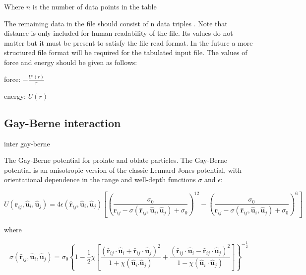 Where $n$ is the number of data points in the table

The remaining data in the file should consist of n data triples
  . Note that distance is only
included for human readability of the file. Its values do not matter
but it must be present to satisfy the file read format. In the future
a more structured file format will be required for the tabulated input
file. The values of force and energy should be given as follows:

force: $-\frac{U'(r)}{r}$

energy: $U(r)$

\subsection{Gay-Berne interaction}

\begin{essyntax}
  inter   gay-berne
    
     
\end{essyntax}

The Gay-Berne potential for prolate and oblate particles. The
Gay-Berne potential is an anisotropic version of the classic
Lennard-Jones potential, with orientational dependence in the range
and well-depth functions $\sigma$ and $\epsilon$:

\[ U(\mathbf{r}_{ij}, \mathbf{\hat{u}}_i, \mathbf{\hat{u}}_j) = 4
\epsilon(\mathbf{\hat{r}}_{ij}, \mathbf{\hat{u}}_i,
\mathbf{\hat{u}}_j) \left[ \left(\frac
    {\sigma_0}{\mathbf{r}_{ij}-\sigma(\mathbf{\hat{r}}_{ij},
      \mathbf{\hat{u}}_i, \mathbf{\hat{u}}_j)+\sigma_0}\right)^{12}-
  \left(\frac {\sigma_0}{\mathbf{r}_{ij}-\sigma(\mathbf{\hat{r}}_{ij},
      \mathbf{\hat{u}}_i, \mathbf{\hat{u}}_j)+\sigma_0}\right)^{6}
\right] \]

where

\[ \sigma( \mathbf{\hat{r}}_{ij}, \mathbf{\hat{u}}_i,
\mathbf{\hat{u}}_j) = \sigma_{0} \left\{ 1 - \frac{1}{2} \chi \left[
    \frac{ \left( \mathbf{\hat{r}}_{ij} \cdot \mathbf{\hat{u}}_i +
        \mathbf{\hat{r}}_{ij} \cdot \mathbf{\hat{u}}_j \right)^{2} }
    {1 + \chi \left( \mathbf{\hat{u}}_i.\mathbf{\hat{u}}_j \right) } +
    \frac{ \left( \mathbf{\hat{r}}_{ij} \cdot \mathbf{\hat{u}}_i -
        \mathbf{\hat{r}}_{ij} \cdot \mathbf{\hat{u}}_j \right)^{2} }
    {1 - \chi \left( \mathbf{\hat{u}}_i \cdot \mathbf{\hat{u}}_j
      \right) } \right] \right\}^{-\frac{1}{2}} \]

